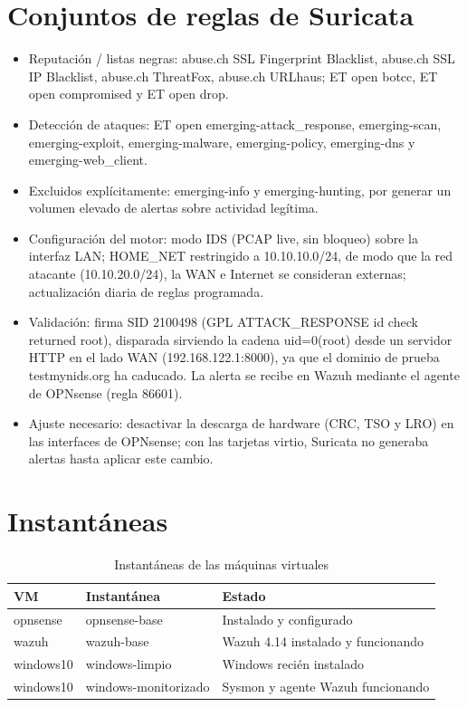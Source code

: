 \section{Conjuntos de reglas de Suricata}
\begin{itemize}[leftmargin=*,itemsep=0pt]
  \item Reputación / listas negras:
        abuse.ch SSL Fingerprint Blacklist, abuse.ch SSL IP Blacklist,
        abuse.ch ThreatFox, abuse.ch URLhaus; ET open botcc,
        ET open compromised y ET open drop.
  \item Detección de ataques:
        ET open emerging-attack\_response, emerging-scan,
        emerging-exploit, emerging-malware, emerging-policy,
        emerging-dns y emerging-web\_client.
  \item Excluidos explícitamente:
        emerging-info y emerging-hunting, por generar un volumen
        elevado de alertas sobre actividad legítima.
  \item Configuración del motor:
        modo IDS (PCAP live, sin bloqueo) sobre la interfaz LAN;
        HOME\_NET restringido a 10.10.10.0/24, de modo
        que la red atacante (10.10.20.0/24), la WAN e Internet
        se consideran externas; actualización diaria de reglas
        programada.
  \item Validación:
        firma SID 2100498 (GPL ATTACK\_RESPONSE id check returned
        root), disparada sirviendo la cadena uid=0(root) desde
        un servidor HTTP en el lado WAN (192.168.122.1:8000),
        ya que el dominio de prueba testmynids.org ha caducado. La alerta
        se recibe en Wazuh mediante el agente de OPNsense
        (regla 86601).
  \item Ajuste necesario:
        desactivar la descarga de hardware (CRC, TSO y LRO) en las
        interfaces de OPNsense; con las tarjetas virtio, Suricata no
        generaba alertas hasta aplicar este cambio.
\end{itemize}

\section{Instantáneas}
\begin{table}[H]\centering\small
\begin{tabularx}{\linewidth}{l l X}
  \toprule
  \textbf{VM} & \textbf{Instantánea} & \textbf{Estado} \\
  \midrule
  opnsense  & opnsense-base         & Instalado y configurado \\
  wazuh     & wazuh-base            & Wazuh 4.14 instalado y funcionando \\
  windows10 & windows-limpio        & Windows recién instalado \\
  windows10 & windows-monitorizado  & Sysmon y agente Wazuh funcionando \\
  \bottomrule
\end{tabularx}
\caption{Instantáneas de las máquinas virtuales}\label{tab:snapshots}
\end{table}
